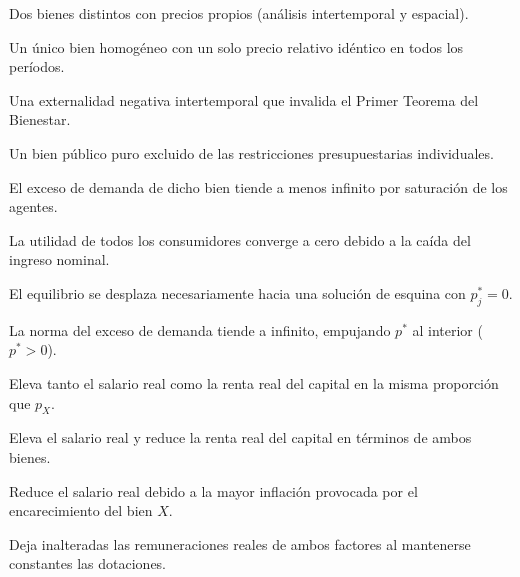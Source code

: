 \begin{opts}
    \item Dos bienes distintos con precios propios (análisis intertemporal y espacial).
    \item Un único bien homogéneo con un solo precio relativo idéntico en todos los períodos.
    \item Una externalidad negativa intertemporal que invalida el Primer Teorema del Bienestar.
    \item Un bien público puro excluido de las restricciones presupuestarias individuales.
\end{opts}

\begin{opts}
    \item El exceso de demanda de dicho bien tiende a menos infinito por saturación de los agentes.
    \item La utilidad de todos los consumidores converge a cero debido a la caída del ingreso nominal.
    \item El equilibrio se desplaza necesariamente hacia una solución de esquina con $p_j^* = 0$.
    \item La norma del exceso de demanda tiende a infinito, empujando $p^*$ al interior ($p^* > 0$).
\end{opts}

\begin{opts}
    \item Eleva tanto el salario real como la renta real del capital en la misma proporción que $p_X$.
    \item Eleva el salario real y reduce la renta real del capital en términos de ambos bienes.
    \item Reduce el salario real debido a la mayor inflación provocada por el encarecimiento del bien $X$.
    \item Deja inalteradas las remuneraciones reales de ambos factores al mantenerse constantes las dotaciones.
\end{opts}

